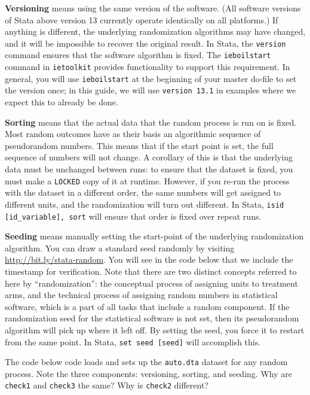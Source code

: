 \textbf{Versioning} means using the same version of the software.
(All software versions of Stata above version 13 currently operate identically on all platforms.)
If anything is different, the underlying randomization algorithms may have changed,
and it will be impossible to recover the original result.
In Stata, the \texttt{version} command ensures that the software algorithm is fixed.
The \texttt{ieboilstart} command in \texttt{ietoolkit} provides functionality to support this requirement.
In general, you will use \texttt{ieboilstart} at the beginning of your master do-file
to set the version once; in this guide, we will use
\texttt{version 13.1} in examples where we expect this to already be done.

\textbf{Sorting} means that the actual data that the random process is run on is fixed.
Most random outcomes have as their basis an algorithmic sequence of pseudorandom numbers.
This means that if the start point is set, the full sequence of numbers will not change.
A corollary of this is that the underlying data must be unchanged between runs:
to ensure that the dataset is fixed, you must make a \texttt{LOCKED} copy of it at runtime.
However, if you re-run the process with the dataset in a different order,
the same numbers will get assigned to different units, and the randomization will turn out different.
In Stata, \texttt{isid [id\_variable], sort} will ensure that order is fixed over repeat runs.

\textbf{Seeding} means manually setting the start-point of the underlying randomization algorithm.
You can draw a standard seed randomly by visiting \url{http://bit.ly/stata-random}.
You will see in the code below that we include the timestamp for verification.
Note that there are two distinct concepts referred to here by ``randomization'':
the conceptual process of assigning units to treatment arms,
and the technical process of assigning random numbers in statistical software,
which is a part of all tasks that include a random component.
If the randomization seed for the statistical software is not set,
then its pseudorandom algorithm will pick up where it left off.
By setting the seed, you force it to restart from the same point.
In Stata, \texttt{set seed [seed]} will accomplish this.

The code below code loads and sets up the \texttt{auto.dta} dataset
for any random process. Note the three components: versioning, sorting, and seeding.
Why are \texttt{check1} and \texttt{check3} the same? Why is \texttt{check2} different?

